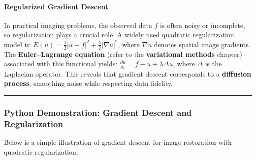 \documentclass[11pt]{article}
\begin{document}
\hypertarget{regularized-gradient-descent}{%
\paragraph{\texorpdfstring{\textbf{Regularized Gradient
Descent}}{Regularized Gradient Descent}}\label{regularized-gradient-descent}}

In practical imaging problems, the observed data \(f\) is often noisy or
incomplete, so regularization plays a crucial role. A widely used
quadratic regularization model is:
\(E(u) = \frac{1}{2}|u - f|^2 + \frac{\lambda}{2}|\nabla u|^2\), where
\(\nabla u\) denotes spatial image gradients. The
\textbf{Euler--Lagrange equation} (refer to the \textbf{variational
methods} chapter) associated with this functional yields:
\(\frac{\partial u}{\partial t} = f - u + \lambda \Delta u\), where
\(\Delta\) is the Laplacian operator. This reveals that gradient descent
corresponds to a \textbf{diffusion process}, smoothing noise while
respecting data fidelity.

\begin{center}\rule{0.5\linewidth}{0.5pt}\end{center}

\hypertarget{python-demonstration-gradient-descent-and-regularization}{%
\subsubsection{\texorpdfstring{\textbf{Python Demonstration: Gradient
Descent and
Regularization}}{Python Demonstration: Gradient Descent and Regularization}}\label{python-demonstration-gradient-descent-and-regularization}}

Below is a simple illustration of gradient descent for image restoration
with quadratic regularization.
\end{document}
